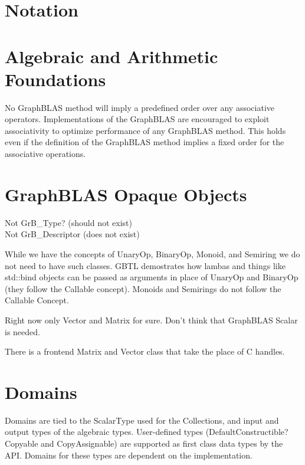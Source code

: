 \section{Notation}


\section{Algebraic and Arithmetic Foundations}


No GraphBLAS method will imply a predefined order over any associative operators. Implementations of the GraphBLAS are encouraged to exploit associativity to optimize performance of any GraphBLAS method. This holds even if the definition of the GraphBLAS method implies a fixed order for the associative operations.

\section{GraphBLAS Opaque Objects}

Not GrB\_Type? (should not exist)\\
Not GrB\_Descriptor (does not exist)

While we have the concepts of UnaryOp, BinaryOp, Monoid, and Semiring we 
do not need to have such classes.  GBTL demostrates how lambas and things 
like std::bind objects can be passed as arguments in place of UnaryOp and
BinaryOp (they follow the Callable concept).  Monoids and Semirings do not 
follow the Callable Concept.

Right now only Vector and Matrix for sure. Don't think that GraphBLAS Scalar
is needed.

There is a frontend Matrix and Vector class that take the place of C handles.

\section{Domains}

Domains are tied to the ScalarType used for the Collections, and input and output
types of the algebraic types.  User-defined types (DefaultConstructible? Copyable and CopyAssignable) are supported as first class data types by the API.  Domains for these
types are dependent on the implementation.


